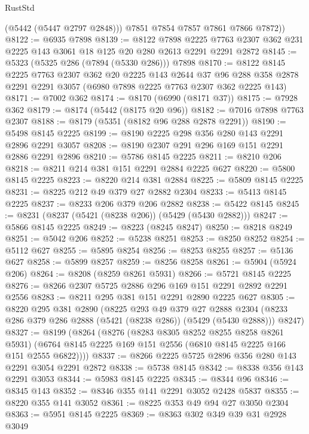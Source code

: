 \begin{lexlean}{RustStd}
\begin{coremodule}
          (@5442 (@5447 @2797 @2848)))
        @7851
        @7854
        @7857
        @7861
        @7866
        @7872))
@8122 := @6935 @7898
@8139 := @8122
    @7898
    @2225
    @7763
    @2307
    @362
    @231
    @2225
    @143
    @3061
    @18
    @125
    @20
    @280
    @2613
    @2291
    @2291
    @2872
@8145 := @5323 (@5325 @286 (@7894 (@5330 @286))) @7898
@8170 := @8122
    @8145
    @2225
    @7763
    @2307
    @362
    @20
    @2225
    @143
    @2644
    @37
    @96
    @288
    @358
    @2878
    @2291
    @2291
    @3057
    (@6980 @7898 @2225 @7763 @2307 @362 @2225 @143)
@8171 := @7002 @362
@8174 := @8170 (@6990 (@8171 @37))
@8175 := @7928 @362
@8179 := @8174 (@5442 (@8175 @20 @96))
@8182 := @7016 @7898 @7763 @2307
@8188 := @8179 (@5351 (@8182 @96 @288 @2878 @2291))
@8190 := @5498 @8145 @2225
@8199 := @8190 @2225 @298 @356 @280 @143 @2291 @2896 @2291 @3057
@8208 := @8190 @2307 @291 @296 @169 @151 @2291 @2886 @2291 @2896
@8210 := @5786 @8145 @2225
@8211 := @8210 @206
@8218 := @8211 @214 @381 @151 @2291 @2884 @2225 @627
@8220 := @5800 @8145 @2225
@8223 := @8220 @214 @381 @2884
@8225 := @5809 @8145 @2225
@8231 := @8225 @212 @49 @379 @27 @2882 @2304
@8233 := @5413 @8145 @2225
@8237 := @8233 @206 @379 @206 @2882
@8238 := @5422 @8145
@8245 := @8231 (@8237 (@5421 (@8238 @206)) (@5429 (@5430 @2882)))
@8247 := @5866 @8145 @2225
@8249 := @8223 (@8245 @8247)
@8250 := @8218 @8249
@8251 := @5042 @206
@8252 := @5238 @8251
@8253 := @8250 @8252
@8254 := @5112 @627
@8255 := @5895 @8254
@8256 := @8253 @8255
@8257 := @5136 @627
@8258 := @5899 @8257
@8259 := @8256 @8258
@8261 := @5904 (@5924 @206)
@8264 := @8208 (@8259 @8261 @5931)
@8266 := @5721 @8145 @2225
@8276 := @8266 @2307 @5725 @2886 @296 @169 @151 @2291 @2892 @2291 @2556
@8283 := @8211 @295 @381 @151 @2291 @2890 @2225 @627
@8305 := @8220
    @295
    @381
    @2890
    (@8225
      @293
      @49
      @379
      @27
      @2888
      @2304
      (@8233 @286 @379 @286 @2888 (@5421 (@8238 @286)) (@5429 (@5430 @2888)))
      @8247)
@8327 := @8199
    (@8264
      (@8276
        (@8283 @8305 @8252 @8255 @8258 @8261 @5931)
        (@6764 @8145 @2225 @169 @151 @2556 (@6810 @8145 @2225 @166 @151 @2555 @6822))))
@8337 := @8266 @2225 @5725 @2896 @356 @280 @143 @2291 @3054 @2291 @2872
@8338 := @5738 @8145
@8342 := @8338 @356 @143 @2291 @3053
@8344 := @5983 @8145 @2225
@8345 := @8344 @96
@8346 := @8345 @143
@8352 := @8346 @355 @141 @2291 @3052 @2428 @5837
@8355 := @8220 @355 @141 @3052
@8361 := @8225 @353 @49 @94 @27 @3050 @2304
@8363 := @5951 @8145 @2225
@8369 := @8363 @302 @349 @39 @31 @2928 @3049

\end{coremodule}
\end{lexlean}

